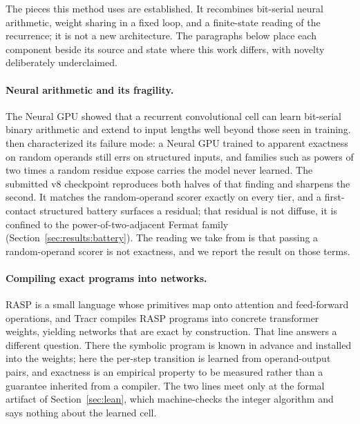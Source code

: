 \documentclass[11pt]{article}
\begin{document}
The pieces this method uses are established. It recombines bit-serial neural
arithmetic, weight sharing in a fixed loop, and a finite-state reading of the
recurrence; it is not a new architecture. The paragraphs below place each component
beside its source and state where this work differs, with novelty deliberately
underclaimed.

\paragraph{Neural arithmetic and its fragility.}
The Neural GPU \citep{kaiser2016neural} showed that a recurrent convolutional cell
can learn bit-serial binary arithmetic and extend to input lengths well beyond
those seen in training. \citet{price2016neural} then characterized its failure
mode: a Neural GPU trained to apparent exactness on random operands still errs on
structured inputs, and families such as powers of two times a random residue
expose carries the model never learned. The submitted v8 checkpoint reproduces
both halves of that finding and sharpens the second. It matches the
random-operand scorer exactly on every tier, and a first-contact structured
battery surfaces a residual; that residual is
not diffuse, it is confined to the power-of-two-adjacent Fermat family
(Section~\ref{sec:results:battery}). The reading we take from
\citet{price2016neural} is that passing a random-operand scorer is not exactness,
and we report the result on those terms.

\paragraph{Compiling exact programs into networks.}
RASP \citep{weiss2021rasp} is a small language whose primitives map onto attention
and feed-forward operations, and Tracr \citep{lindner2023tracr} compiles RASP
programs into concrete transformer weights, yielding networks that are exact by
construction. That line answers a different question. There the symbolic program is
known in advance and installed into the weights; here the per-step transition is
learned from operand-output pairs, and exactness is an empirical property to be
measured rather than a guarantee inherited from a compiler. The two lines meet only
at the formal artifact of Section~\ref{sec:lean}, which machine-checks the integer
algorithm and says nothing about the learned cell.
\end{document}
